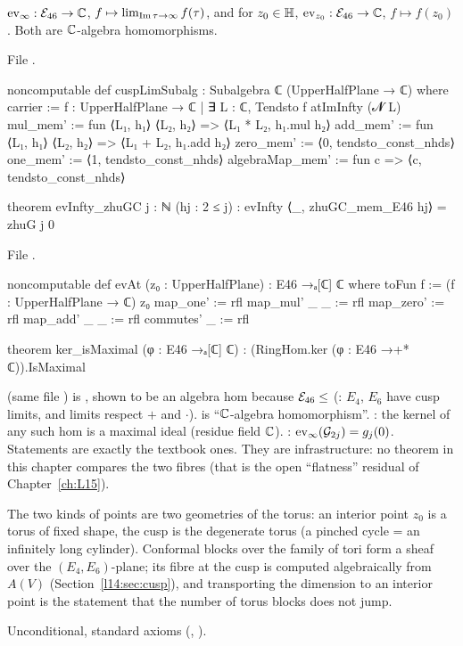 \begin{definition}\label{l14:def:evInfty}
$\mathrm{ev}_\infty:\mathcal{E}_{46}\to{\mathbb{C}}$, $f\mapsto\lim_{\operatorname{Im}\tau\to\infty}f(\tau)$, and for $z_0\in\mathbb{H}$,
$\mathrm{ev}_{z_0}:\mathcal{E}_{46}\to{\mathbb{C}}$, $f\mapsto f(z_0)$. Both are ${\mathbb{C}}$-algebra homomorphisms.
\end{definition}
\noindent File .
\begin{leancode}
noncomputable def cuspLimSubalg : Subalgebra ℂ (UpperHalfPlane → ℂ) where
  carrier := {f : UpperHalfPlane → ℂ | ∃ L : ℂ, Tendsto f atImInfty (𝓝 L)}
  mul_mem' := fun ⟨L₁, h₁⟩ ⟨L₂, h₂⟩ => ⟨L₁ * L₂, h₁.mul h₂⟩
  add_mem' := fun ⟨L₁, h₁⟩ ⟨L₂, h₂⟩ => ⟨L₁ + L₂, h₁.add h₂⟩
  zero_mem' := ⟨0, tendsto_const_nhds⟩
  one_mem' := ⟨1, tendsto_const_nhds⟩
  algebraMap_mem' := fun c => ⟨c, tendsto_const_nhds⟩

theorem evInfty_zhuGC {j : ℕ} (hj : 2 ≤ j) :
    evInfty ⟨_, zhuGC_mem_E46 hj⟩ = zhuG j 0
\end{leancode}
\noindent File .
\begin{leancode}
noncomputable def evAt (z₀ : UpperHalfPlane) : E46 →ₐ[ℂ] ℂ where
  toFun f := (f : UpperHalfPlane → ℂ) z₀
  map_one' := rfl
  map_mul' _ _ := rfl
  map_zero' := rfl
  map_add' _ _ := rfl
  commutes' _ := rfl

theorem ker_isMaximal (φ : E46 →ₐ[ℂ] ℂ) :
    (RingHom.ker (φ : E46 →+* ℂ)).IsMaximal
\end{leancode}
\begin{dictionary}
 (same file ) is , shown to be an algebra hom because
$\mathcal{E}_{46}\le$  (: $E_4$, $E_6$ have cusp limits, and limits respect
$+$ and $\cdot$).  is ``${\mathbb{C}}$-algebra homomorphism''. : the kernel of any such hom is a maximal
ideal (residue field ${\mathbb{C}}$). : $\mathrm{ev}_\infty(\mathcal G_{2j}) = g_j(0)$. Statements are exactly the
textbook ones. They are infrastructure: no theorem in this chapter compares the two fibres (that is the open ``flatness''
residual of Chapter~\ref{ch:L15}).
\end{dictionary}
\begin{physics}
The two kinds of points are two geometries of the torus: an interior point $z_0$ is a torus of fixed shape, the cusp is the
degenerate torus (a pinched cycle = an infinitely long cylinder). Conformal blocks over the family of tori form a sheaf over
the $(E_4,E_6)$-plane; its fibre at the cusp is computed algebraically from $A(V)$ (Section~\ref{l14:sec:cusp}), and
transporting the dimension to an interior point is the statement that the number of torus blocks does not jump.
\end{physics}
\begin{status}
Unconditional, standard axioms (, ).
\end{status}

